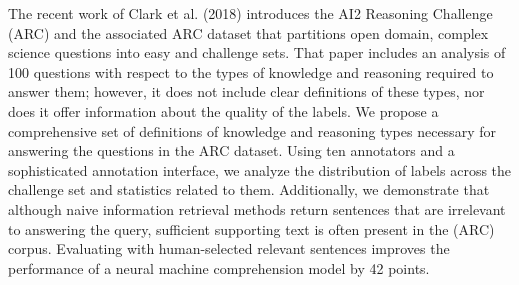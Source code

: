 The recent work of Clark et al. (2018) introduces the AI2 Reasoning Challenge (ARC) and the associated ARC dataset that partitions open domain, complex science questions into easy and challenge sets. That paper includes an analysis of 100 questions with respect to the types of knowledge and reasoning required to answer them; however, it does not include clear definitions of these types, nor does it offer information about the quality of the labels.  We propose a comprehensive set of definitions of knowledge and reasoning types necessary for answering the questions in the ARC dataset.  Using ten annotators and a sophisticated annotation interface, we analyze the distribution of labels across the challenge set and statistics related to them. Additionally, we demonstrate that although naive information retrieval methods return sentences that are irrelevant to answering the query,  sufficient supporting text is often present in the (ARC) corpus. Evaluating with human-selected relevant sentences improves the performance of a neural machine comprehension model by 42 points.
